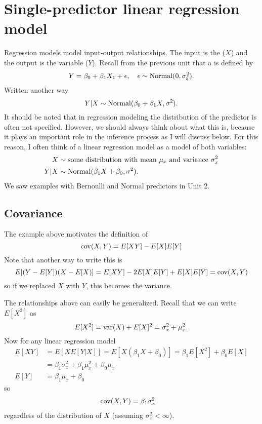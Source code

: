 \section{Single-predictor linear regression model}
Regression models model input-output relationships. The input is the  ($X$) and the output is the  variable ($Y$). Recall from the previous unit that a   is defined by
\begin{align*}
Y = \beta_0 + \beta_1 X_1 + \epsilon,\quad \epsilon \sim {\rm Normal}(0,\sigma_{\xi}^2).
\end{align*}
Written another way
\begin{equation}
Y|X \sim {\rm Normal}(\beta_0 + \beta_1 X,\sigma^2). 
\end{equation}
It should be noted that in regression modeling the distribution of the predictor is often not specified. However, we should always think about what this is, because it plays an important role in the inference process as I will discuss below. For this reason, I often think of a linear regression model as a model of both variables:
\begin{align}
\begin{split}\label{eq:linreg}
X &\sim \text{some distribution with mean $\mu_x$ and variance $\sigma_x^2$}\\
Y|X &\sim {\rm Normal}(\beta_1X + \beta_0,\sigma^2). 
\end{split}
\end{align}
We saw examples with Bernoulli and Normal predictors in Unit 2. 



\subsection{Covariance} 
 The example above motivates the definition of 
\begin{equation}
{\rm cov}(X,Y) = E[XY]-E[X]E[Y]
\end{equation}
Note that another way to write this is 
\begin{equation*}
 E[(Y-E[Y])(X-E[X)] = E[XY] - 2E[X]E[Y]+E[X]E[Y] = {\rm cov}(X,Y)
\end{equation*}
so if we replaced $X$ with $Y$, this becomes the variance. 
 
 
The relationships above can easily be generalized. 
Recall that we can write $E[X^2]$ as
\begin{equation*}
E[X^2] ={\rm var}(X) + E[X]^2 =  \sigma_x^2 + \mu_x^2. 
\end{equation*}
Now for any linear regression model
\begin{align*}
E[XY] &= E[XE[Y|X]] = E[X(\beta_1 X+\beta_0)] = \beta_1E[X^2] + \beta_0 E[X] \\
&= \beta_1\sigma_x^2 +\beta_1 \mu_x^2 +\beta_0 \mu_x\\
E[Y] &= \beta_1\mu_x +\beta_0
\end{align*}
so 
\begin{align*}
{\rm cov}(X,Y) &= \beta_1\sigma_x^2
\end{align*}
regardless of the distribution of $X$ (assuming $\sigma_x^2 <\infty$). %

